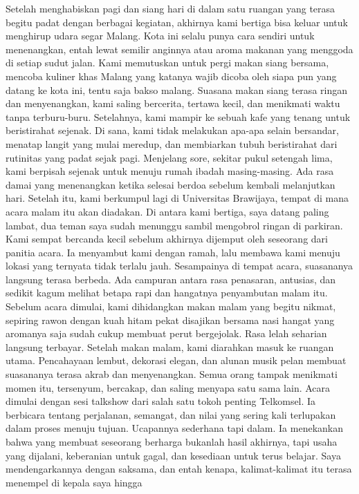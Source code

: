 \documentclass[
  letterpaper,
  DIV=11,
  numbers=noendperiod]{scrreprt}
\begin{document}
Setelah menghabiskan pagi dan siang hari di dalam satu ruangan yang
terasa begitu padat dengan berbagai kegiatan, akhirnya kami bertiga bisa
keluar untuk menghirup udara segar Malang. Kota ini selalu punya cara
sendiri untuk menenangkan, entah lewat semilir anginnya atau aroma
makanan yang menggoda di setiap sudut jalan. Kami memutuskan untuk pergi
makan siang bersama, mencoba kuliner khas Malang yang katanya wajib
dicoba oleh siapa pun yang datang ke kota ini, tentu saja bakso malang.
Suasana makan siang terasa ringan dan menyenangkan, kami saling
bercerita, tertawa kecil, dan menikmati waktu tanpa terburu-buru.
Setelahnya, kami mampir ke sebuah kafe yang tenang untuk beristirahat
sejenak. Di sana, kami tidak melakukan apa-apa selain bersandar, menatap
langit yang mulai meredup, dan membiarkan tubuh beristirahat dari
rutinitas yang padat sejak pagi. Menjelang sore, sekitar pukul setengah
lima, kami berpisah sejenak untuk menuju rumah ibadah masing-masing. Ada
rasa damai yang menenangkan ketika selesai berdoa sebelum kembali
melanjutkan hari. Setelah itu, kami berkumpul lagi di Universitas
Brawijaya, tempat di mana acara malam itu akan diadakan. Di antara kami
bertiga, saya datang paling lambat, dua teman saya sudah menunggu sambil
mengobrol ringan di parkiran. Kami sempat bercanda kecil sebelum
akhirnya dijemput oleh seseorang dari panitia acara. Ia menyambut kami
dengan ramah, lalu membawa kami menuju lokasi yang ternyata tidak
terlalu jauh. Sesampainya di tempat acara, suasananya langsung terasa
berbeda. Ada campuran antara rasa penasaran, antusias, dan sedikit kagum
melihat betapa rapi dan hangatnya penyambutan malam itu. Sebelum acara
dimulai, kami dihidangkan makan malam yang begitu nikmat, sepiring rawon
dengan kuah hitam pekat disajikan bersama nasi hangat yang aromanya saja
sudah cukup membuat perut bergejolak. Rasa lelah seharian langsung
terbayar. Setelah makan malam, kami diarahkan masuk ke ruangan utama.
Pencahayaan lembut, dekorasi elegan, dan alunan musik pelan membuat
suasananya terasa akrab dan menyenangkan. Semua orang tampak menikmati
momen itu, tersenyum, bercakap, dan saling menyapa satu sama lain. Acara
dimulai dengan sesi talkshow dari salah satu tokoh penting Telkomsel. Ia
berbicara tentang perjalanan, semangat, dan nilai yang sering kali
terlupakan dalam proses menuju tujuan. Ucapannya sederhana tapi dalam.
Ia menekankan bahwa yang membuat seseorang berharga bukanlah hasil
akhirnya, tapi usaha yang dijalani, keberanian untuk gagal, dan
kesediaan untuk terus belajar. Saya mendengarkannya dengan saksama, dan
entah kenapa, kalimat-kalimat itu terasa menempel di kepala saya hingga
\end{document}
